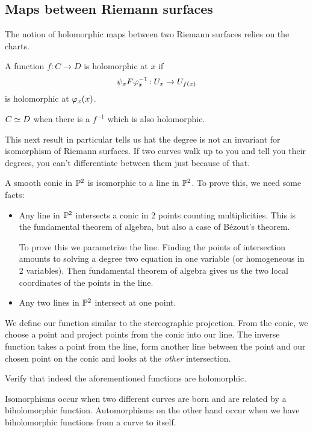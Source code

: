 \documentclass[12pt]{memoir}
\begin{document}
\subsection{Maps between Riemann surfaces}

The notion of holomorphic maps between two Riemann surfaces relies on the charts.

\begin{Def}
    A function $f:C\to D$ is holomorphic at $x$ if 
    $$\psi_xF\varphi_x^{-1}\mathbin{:} U_{x}\to U_{f(x)}$$
    is holomorphic at $\varphi_x(x)$.\par
    $C\simeq D$ when there is a $f^{-1}$ which is also holomorphic.
\end{Def}

This next result in particular tells us hat the degree is not an invariant for isomorphism of Riemann surfaces. If two curves walk up to you and tell you their degrees, you can't differentiate between them just because of that.
\begin{Ex}
    A smooth conic in $\mathbb{P}^2$ is isomorphic to a line in $\mathbb{P}^2$. To prove this, we need some facts:
    \begin{itemize}
        \item Any line in $\mathbb{P}^2$ intersects a conic in 2 points counting multiplicities. This is the fundamental theorem of algebra, but also a case of Bézout's theorem.\par
        To prove this we parametrize the line. Finding the points of intersection amounts to solving a degree two equation in one variable (or homogeneous in 2 variables). Then fundamental theorem of algebra gives us the two local coordinates of the points in the line.
        \item Any two lines in $\mathbb{P}^2$ intersect at one point. 
    \end{itemize}
    We define our function similar to the stereographic projection. From the conic, we choose a point and project points from the conic into our line. The inverse function takes a point from the line, form another line between the point and our chosen point on the conic and looks at the \emph{other} intersection.
\end{Ex}

\begin{Ej}
    Verify that indeed the aforementioned functions are holomorphic.
\end{Ej}

Isomorphisms occur when two different curves are born and are related by a biholomorphic function. Automorphisms on the other hand occur when we have biholomorphic functions from a curve to itself.
\end{document}
